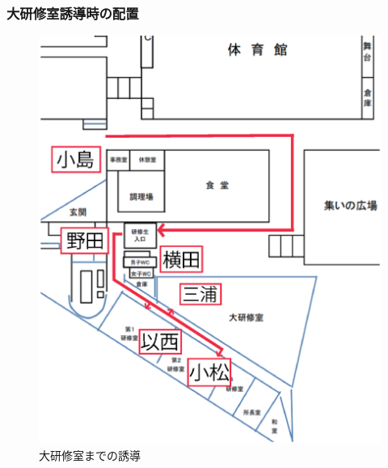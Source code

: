 \subsubsection{大研修室誘導時の配置}
\begin{figure}[htbp]
  \begin{center}
   \includegraphics[scale=0.4]{./03/yuudou.eps}
  \end{center}
  \caption{大研修室までの誘導}
  \label{fig:hare}
\end{figure}

\newpage




